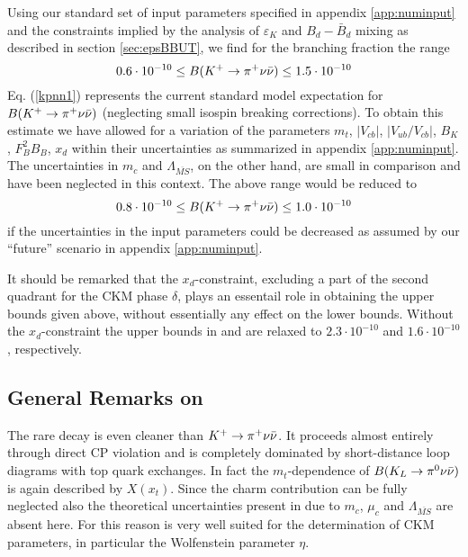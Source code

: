 Using our standard set of input parameters specified in appendix
\ref{app:numinput} and the constraints implied by the analysis of
$\varepsilon_K$ and $B_d-\bar B_d$ mixing as described in section
\ref{sec:epsBBUT}, we find for the \kpnn branching fraction
the range
\begin{equation}\label{kpnn1}
0.6\cdot 10^{-10}\leq B(K^+ \to \pi^+\nu\bar\nu)\leq 1.5\cdot 10^{-10}
\end{equation}
Eq. (\ref{kpnn1}) represents the current standard model expectation for
$B(K^+ \to \pi^+\nu\bar\nu)$ (neglecting small isospin breaking corrections). To obtain
this estimate we have allowed for a variation of the parameters $m_t$,
$|V_{cb}|$, $|V_{ub}/V_{cb}|$, $B_K$, $F^2_B B_B$, $x_d$ within their
uncertainties as summarized in appendix \ref{app:numinput}. The
uncertainties in $m_c$ and $\Lambda_{\overline{MS}}$, on the other
hand, are small in comparison and have been neglected in this context.
The above range would be reduced to \begin{equation}\label{kpnn2}
0.8\cdot 10^{-10}\leq B(K^+ \to \pi^+\nu\bar\nu)\leq 1.0\cdot 10^{-10} \end{equation} if
the uncertainties in the input parameters could be decreased as assumed
by our ``future'' scenario in appendix \ref{app:numinput}.

It should be remarked that the $x_d$-constraint, excluding a part of
the second quadrant for the CKM phase $\delta$, plays an essentail role
in obtaining the upper bounds given above, without essentially any
effect on the lower bounds. Without the $x_d$-constraint the upper
bounds in  and  are relaxed to $2.3 \cdot
10^{-10}$ and $1.6 \cdot 10^{-10}$, respectively.

\subsection{General Remarks on \klpnn}
            \label{sec:Kpnn:GeneralKL}
The rare decay \klpnn is even cleaner than $K^+ \to \pi^+\nu\bar\nu$. It proceeds almost
entirely through direct CP violation \cite{littenberg:89} and
is completely dominated by short-distance loop diagrams with top quark
exchanges. In fact the $m_t$-dependence of $B(K_L \to \pi^0\nu\bar\nu)$ is again
described by $X(x_t)$.  Since the charm contribution can be fully
neglected also the theoretical uncertainties present in \kpnn due to
$m_c$, $\mu_c$ and $\Lambda_{\overline{MS}}$ are absent here. For this
reason \klpnn is very well suited for the determination of CKM
parameters, in particular the Wolfenstein parameter $\eta$.

